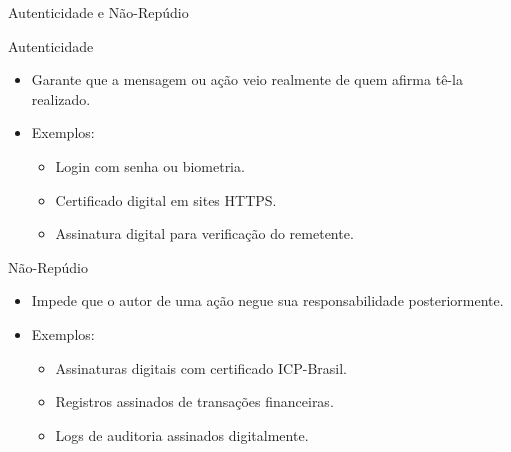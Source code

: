 \begin{frame}{Autenticidade e Não-Repúdio}
    \begin{block}{Autenticidade}
        \begin{itemize}
            \item Garante que a mensagem ou ação veio realmente de quem afirma tê-la realizado.
            \item Exemplos:
            \begin{itemize}
                \item Login com senha ou biometria.
                \item Certificado digital em sites HTTPS.
                \item Assinatura digital para verificação do remetente.
            \end{itemize}
        \end{itemize}
    \end{block}

    \begin{block}{Não-Repúdio}
        \begin{itemize}
            \item Impede que o autor de uma ação negue sua responsabilidade posteriormente.
            \item Exemplos:
            \begin{itemize}
                \item Assinaturas digitais com certificado ICP-Brasil.
                \item Registros assinados de transações financeiras.
                \item Logs de auditoria assinados digitalmente.
            \end{itemize}
        \end{itemize}
    \end{block}
\end{frame}


